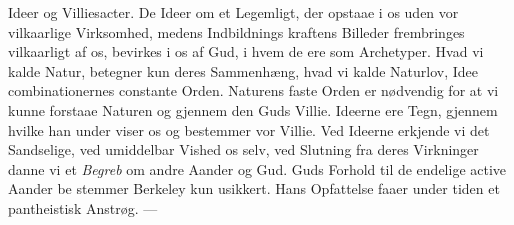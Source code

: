 \documentclass[12pt,a4paper]{book}
\begin{document}
Ideer og Villiesacter. De Ideer om et Legemligt, der opstaae
i os uden vor vilkaarlige Virksomhed, medens Indbildnings\-%
kraftens Billeder frembringes vilkaarligt af os, bevirkes i os af
Gud, i hvem de ere som Archetyper. Hvad vi kalde Natur,
betegner kun deres Sammenhæng, hvad vi kalde Naturlov, Idee\-%
combinationernes constante Orden. Naturens faste Orden er
nødvendig for at vi kunne forstaae Naturen og gjennem den
Guds Villie. Ideerne ere Tegn, gjennem hvilke han under\-%
viser os og bestemmer vor Villie. Ved Ideerne erkjende vi
det Sandselige, ved umiddelbar Vished os selv, ved Slutning
fra deres Virkninger danne vi et \emph{Begreb} om andre Aander
og Gud. Guds Forhold til de endelige active Aander be\-%
stemmer Berkeley kun usikkert. Hans Opfattelse faaer under\-%
tiden et pantheistisk Anstrøg. ---
\end{document}
